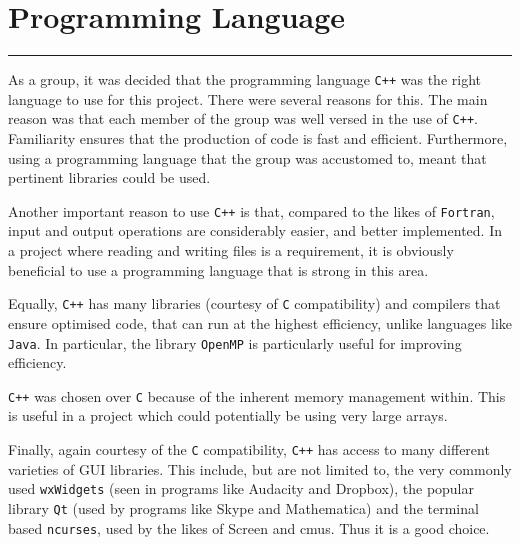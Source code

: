 \section{Programming Language}
\vspace{-2em}\rule{\textwidth}{1pt}\vspace{1em}

As a group, it was decided that the programming language \texttt{C++} was the right language to use for this project.
There were several reasons for this.
The main reason was that each member of the group was well versed in the use of \texttt{C++}.
Familiarity ensures that the production of code is fast and efficient.
Furthermore, using a programming language that the group was accustomed to, meant that pertinent libraries could be used.

Another important reason to use \texttt{C++} is that, compared to the likes of \texttt{Fortran}, input and output operations are considerably easier, and better implemented.
In a project where reading and writing files is a requirement, it is obviously beneficial to use a programming language that is strong in this area.

Equally, \texttt{C++} has many libraries (courtesy of \texttt{C} compatibility) and compilers that ensure optimised code, that can run at the highest efficiency, unlike languages like \texttt{Java}.
In particular, the library \texttt{OpenMP} is particularly useful for improving efficiency.

\texttt{C++} was chosen over \texttt{C} because of the inherent memory management within.
This is useful in a project which could potentially be using very large arrays.

Finally, again courtesy of the \texttt{C} compatibility, \texttt{C++} has access to many different varieties of GUI libraries.
This include, but are not limited to, the very commonly used \texttt{wxWidgets} (seen in programs like Audacity and Dropbox), the popular library \texttt{Qt} (used by programs like Skype and Mathematica) and the terminal based \texttt{ncurses}, used by the likes of Screen and cmus.
Thus it is a good choice.
